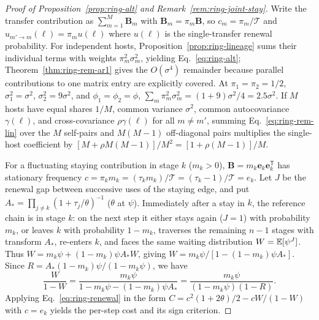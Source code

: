 \begin{proof}[Proof of Proposition~{\upshape\ref{prop:ring-alt}} and Remark~{\upshape\ref{rem:ring-joint-stay}}]
Write the transfer contribution as $\sum_{m=1}^M \mathbf{B}_m$ with $\mathbf{B}_m = \pi_m \mathbf{B}$, so $c_m = \pi_m/\mathcal{T}$ and $u_{m' \to m}(\ell) = \pi_m u(\ell)$ where $u(\ell)$ is the single-transfer renewal probability. For independent hosts, Proposition~\ref{prop:ring-lineage} sums their individual terms with weights $\pi_m^2\sigma_m^2$, yielding Eq.~\eqref{eq:ring-alt}; Theorem~\ref{thm:ring-rem-ar1} gives the $O(\sigma^4)$ remainder because parallel contributions to one matrix entry are explicitly covered. At $\pi_1 = \pi_2 = 1/2$, $\sigma_1^2 = \sigma^2$, $\sigma_2^2 = 9\sigma^2$, and $\phi_1 = \phi_2 = \phi$, $\sum_m \pi_m^2\sigma_m^2 = (1 + 9)\sigma^2/4 = 2.5\sigma^2$. If $M$ hosts have equal shares $1/M$, common variance $\sigma^2$, common autocovariance $\gamma(\ell)$, and cross-covariance $\rho\gamma(\ell)$ for all $m \ne m'$, summing Eq.~\eqref{eq:ring-rem-lin} over the $M$ self-pairs and $M(M - 1)$ off-diagonal pairs multiplies the single-host coefficient by $[M + \rho M(M - 1)]/M^2 = [1 + \rho(M - 1)]/M$.

For a fluctuating staying contribution in stage $k$ ($m_k > 0$), $\mathbf{B} = m_k\mathbf{e}_k\mathbf{e}_k^{\mathsf{T}}$ has stationary frequency $c = \pi_k m_k = (\tau_k m_k)/\mathcal{T} = (\tau_k - 1)/\mathcal{T} = e_k$. Let $J$ be the renewal gap between successive uses of the staying edge, and put $A_* = \prod_{j \ne k} (1 + \tau_j/\theta)^{-1}$ ($\theta$ at $\psi$). Immediately after a stay in $k$, the reference chain is in stage $k$: on the next step it either stays again ($J = 1$) with probability $m_k$, or leaves $k$ with probability $1 - m_k$, traverses the remaining $n - 1$ stages with transform $A_*$, re-enters $k$, and faces the same waiting distribution $W = \mathbb{E}[\psi^J]$. Thus $W = m_k\psi + (1 - m_k)\psi A_* W$, giving $W = m_k\psi / [1 - (1 - m_k)\psi A_*]$. Since $R = A_* (1 - m_k)\psi / (1 - m_k\psi)$, we have
\[
\frac{W}{1 - W} = \frac{m_k\psi}{1 - m_k\psi - (1 - m_k)\psi A_*} = \frac{m_k\psi}{(1 - m_k\psi)(1 - R)}.
\]
Applying Eq.~\eqref{eq:ring-renewal} in the form $C = c^2(1 + 2\theta)/2 - c W/(1 - W)$ with $c = e_k$ yields the per-step cost and its sign criterion.


\end{proof}
